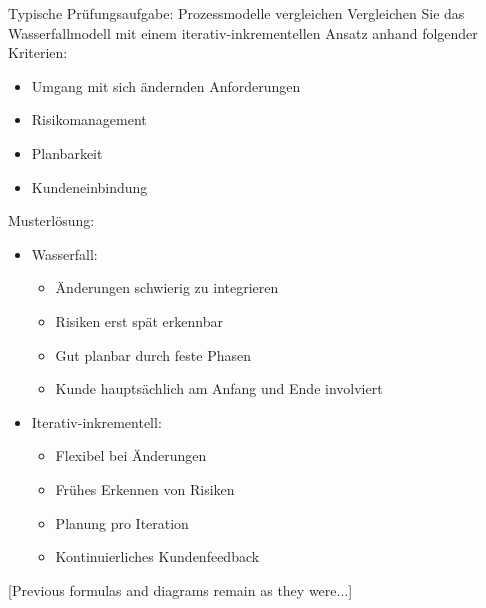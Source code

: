 \begin{example}{Typische Prüfungsaufgabe: Prozessmodelle vergleichen}
Vergleichen Sie das Wasserfallmodell mit einem iterativ-inkrementellen Ansatz anhand folgender Kriterien:
\begin{itemize}
    \item Umgang mit sich ändernden Anforderungen
    \item Risikomanagement
    \item Planbarkeit
    \item Kundeneinbindung
\end{itemize}

Musterlösung:
\begin{itemize}
    \item Wasserfall:
    \begin{itemize}
        \item Änderungen schwierig zu integrieren
        \item Risiken erst spät erkennbar
        \item Gut planbar durch feste Phasen
        \item Kunde hauptsächlich am Anfang und Ende involviert
    \end{itemize}
    \item Iterativ-inkrementell:
    \begin{itemize}
        \item Flexibel bei Änderungen
        \item Frühes Erkennen von Risiken
        \item Planung pro Iteration
        \item Kontinuierliches Kundenfeedback
    \end{itemize}
\end{itemize}
\end{example}

[Previous formulas and diagrams remain as they were...]